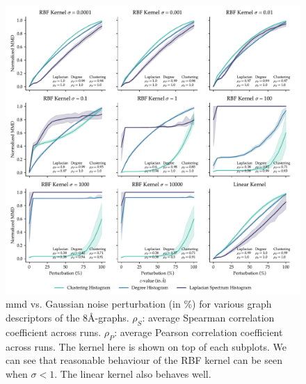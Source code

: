 \begin{figure}[!htbp]
  \centering
  \includegraphics[width=\textwidth]{./figures/results/res_1_2.pdf}
  \caption[Influence of kernel parameters on \acrshort{mmd} behaviour.]{\acrshort{mmd} vs. Gaussian
    noise perturbation (in \%) for various graph descriptors of the
    8\si{\angstrom}-graphs. $\rho_{S}$: average Spearman correlation coefficient
    across runs. $\rho_{P}$: average Pearson correlation coefficient across runs.
    The kernel here is shown on top of each subplots. We can see that reasonable
    behaviour of the RBF kernel can be seen when $\sigma<1$. The linear kernel also
    behaves well.}
  \label{fig:mmd_effect_kernel}
\end{figure}

